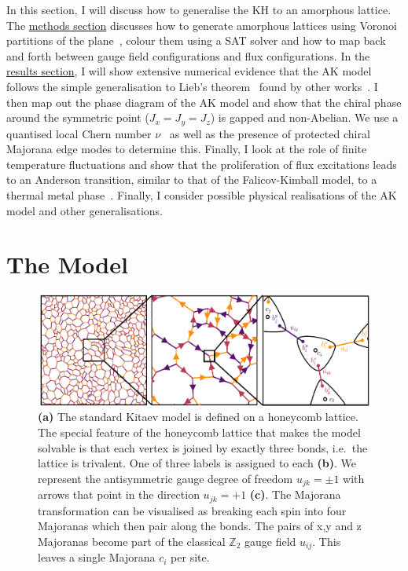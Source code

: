 In this section, I will discuss how to generalise the KH to an amorphous lattice. The \protect\hyperlink{amk-methods}{methods section} discusses how to generate amorphous lattices using Voronoi partitions of the plane~\autocite{mitchellAmorphousTopologicalInsulators2018,marsalTopologicalWeaireThorpeModels2020}, colour them using a SAT solver and how to map back and forth between gauge field configurations and flux configurations. In the \protect\hyperlink{amk-results}{results section}, I will show extensive numerical evidence that the AK model follows the simple generalisation to Lieb's theorem~\autocite{lieb_flux_1994} found by other works~\autocite{eschmannThermodynamicClassificationThreedimensional2020,Yao2009,eschmann2019thermodynamics,Peri2020}. I then map out the phase diagram of the AK model and show that the chiral phase around the symmetric point (\(J_x = J_y = J_z\)) is gapped and non-Abelian. We use a quantised local Chern number \(\nu\)~\autocite{peru_preprint,mitchellAmorphousTopologicalInsulators2018} as well as the presence of protected chiral Majorana edge modes to determine this. Finally, I look at the role of finite temperature fluctuations and show that the proliferation of flux excitations leads to an Anderson transition, similar to that of the Falicov-Kimball model, to a thermal metal phase~\autocite{Laumann2012,lahtinenTopologicalLiquidNucleation2012,selfThermallyInducedMetallic2019}. Finally, I consider possible physical realisations of the AK model and other generalisations.

\hypertarget{amk-Model}{%
\section{The Model}\label{amk-Model}}

\hypertarget{fig:amk-zoom}{%
\begin{figure}
\centering
\includegraphics[width=1\textwidth,height=\textheight]{figure_code/amk_chapter/intro/amk_zoom/amk_zoom_by_hand}
\caption[{The Kitaev Honeycomb Model}]{\textbf{(a)} The standard Kitaev model is defined on a honeycomb lattice. The special feature of the honeycomb lattice that makes the model solvable is that each vertex is joined by exactly three bonds, i.e.~the lattice is trivalent. One of three labels is assigned to each \textbf{(b)}. We represent the antisymmetric gauge degree of freedom \(u_{jk} = \pm 1\) with arrows that point in the direction \(u_{jk} = +1\) \textbf{(c)}. The Majorana transformation can be visualised as breaking each spin into four Majoranas which then pair along the bonds. The pairs of x,y and z Majoranas become part of the classical \(\mathbb{Z}_2\) gauge field \(u_{ij}\). This leaves a single Majorana \(c_i\) per site.}
\label{fig:amk-zoom}
\end{figure}
}

